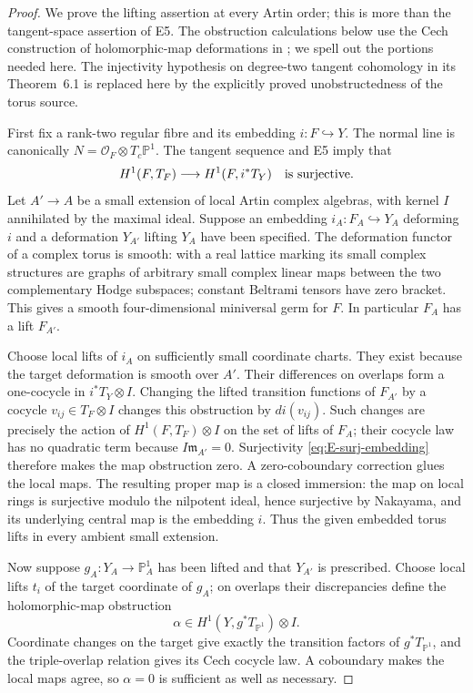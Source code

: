 \begin{proof}
We prove the lifting assertion at every Artin order; this is more
than the tangent-space assertion of E5. The obstruction calculations
below use the Cech construction of holomorphic-map deformations
in \cite[\S4, equations (4.3)--(4.5), and \S6]{Horikawa1974};
we spell out the portions needed here. The injectivity hypothesis
on degree-two tangent cohomology in its Theorem~6.1 is replaced
here by the explicitly proved unobstructedness of the torus source.

First fix a rank-two regular fibre and its embedding $i:F\hookrightarrow
Y$. The normal line is canonically $N=\mathcal O_F\otimes T_c\mathbb
P^1$. The tangent sequence and E5 imply that
\begin{equation}\label{eq:E-surj-embedding}
 H^1(F,T_F)\longrightarrow H^1(F,i^*T_Y)
 \quad\hbox{is surjective}.
\end{equation}
Let $A'\to A$ be a small extension of local Artin complex algebras,
with kernel $I$ annihilated by the maximal ideal. Suppose an embedding
$i_A:F_A\hookrightarrow Y_A$ deforming $i$ and a deformation
$Y_{A'}$ lifting $Y_A$ have been specified. The deformation functor
of a complex torus is smooth: with a real lattice marking its small
complex structures are graphs of arbitrary small complex linear maps
between the two complementary Hodge subspaces; constant Beltrami
tensors have zero bracket. This gives a smooth four-dimensional
miniversal germ for $F$. In particular $F_A$ has a lift $F_{A'}$.

Choose local lifts of $i_A$ on sufficiently small coordinate charts.
They exist because the target deformation is smooth over $A'$.
Their differences on overlaps form a one-cocycle in
$i^*T_Y\otimes I$. Changing the lifted transition functions of
$F_{A'}$ by a cocycle $v_{ij}\in T_F\otimes I$ changes this
obstruction by $di(v_{ij})$. Such changes are precisely the action
of $H^1(F,T_F)\otimes I$ on the set of lifts of $F_A$; their
cocycle law has no quadratic term because $I\mathfrak m_{A'}=0$.
Surjectivity \eqref{eq:E-surj-embedding} therefore makes the map
obstruction zero. A zero-coboundary correction glues the local maps.
The resulting proper map is a closed immersion: the map on local
rings is surjective modulo the nilpotent ideal, hence surjective
by Nakayama, and its underlying central map is the embedding $i$.
Thus the given embedded torus lifts in every ambient small extension.

Now suppose $g_A:Y_A\to\mathbb P^1_A$ has been lifted and that
$Y_{A'}$ is prescribed. Choose local lifts $t_i$ of the target
coordinate of $g_A$; on overlaps their discrepancies define the
holomorphic-map obstruction
\[
 \alpha\in H^1(Y,g^*T_{\mathbb P^1})\otimes I.
\]
Coordinate changes on the target give exactly the transition factors
of $g^*T_{\mathbb P^1}$, and the triple-overlap relation gives its
Cech cocycle law. A coboundary makes the local maps agree, so
$\alpha=0$ is sufficient as well as necessary.


\end{proof}
